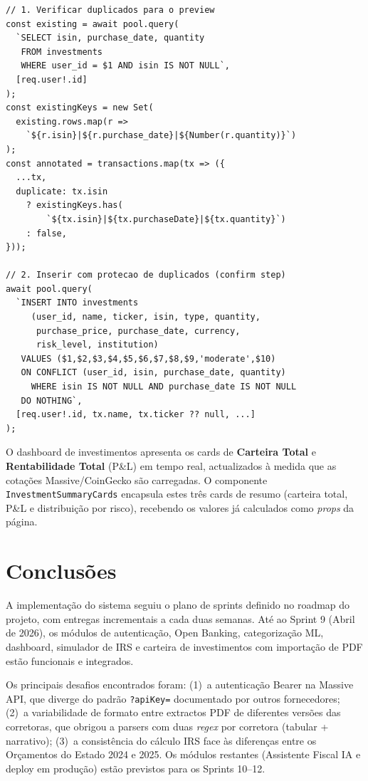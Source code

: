 \begin{lstlisting}[caption={Deduplicação antes do preview e inserção idempotente (routes/investments.ts).},label={lst:dedup}]
// 1. Verificar duplicados para o preview
const existing = await pool.query(
  `SELECT isin, purchase_date, quantity
   FROM investments
   WHERE user_id = $1 AND isin IS NOT NULL`,
  [req.user!.id]
);
const existingKeys = new Set(
  existing.rows.map(r =>
    `${r.isin}|${r.purchase_date}|${Number(r.quantity)}`)
);
const annotated = transactions.map(tx => ({
  ...tx,
  duplicate: tx.isin
    ? existingKeys.has(
        `${tx.isin}|${tx.purchaseDate}|${tx.quantity}`)
    : false,
}));

// 2. Inserir com protecao de duplicados (confirm step)
await pool.query(
  `INSERT INTO investments
     (user_id, name, ticker, isin, type, quantity,
      purchase_price, purchase_date, currency,
      risk_level, institution)
   VALUES ($1,$2,$3,$4,$5,$6,$7,$8,$9,'moderate',$10)
   ON CONFLICT (user_id, isin, purchase_date, quantity)
     WHERE isin IS NOT NULL AND purchase_date IS NOT NULL
   DO NOTHING`,
  [req.user!.id, tx.name, tx.ticker ?? null, ...]
);
\end{lstlisting}

O dashboard de investimentos apresenta os cards de \textbf{Carteira Total} e \textbf{Rentabilidade Total} (P\&L) em tempo real, actualizados à medida que as cotações Massive/CoinGecko são carregadas. O componente \texttt{InvestmentSummaryCards} encapsula estes três cards de resumo (carteira total, P\&L e distribuição por risco), recebendo os valores já calculados como \textit{props} da página.


\section{Conclusões}
\label{sec:impl-conclusoes}

A implementação do sistema seguiu o plano de sprints definido no roadmap do projeto, com entregas incrementais a cada duas semanas. Até ao Sprint 9 (Abril de 2026), os módulos de autenticação, Open Banking, categorização ML, dashboard, simulador de IRS e carteira de investimentos com importação de PDF estão funcionais e integrados.

Os principais desafios encontrados foram: (1)~a autenticação Bearer na Massive API, que diverge do padrão \texttt{?apiKey=} documentado por outros fornecedores; (2)~a variabilidade de formato entre extractos PDF de diferentes versões das corretoras, que obrigou a parsers com duas \textit{regex} por corretora (tabular + narrativo); (3)~a consistência do cálculo IRS face às diferenças entre os Orçamentos do Estado 2024 e 2025. Os módulos restantes (Assistente Fiscal IA e deploy em produção) estão previstos para os Sprints 10--12.
